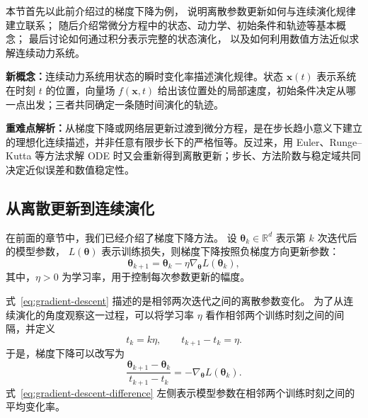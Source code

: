 \documentclass[UTF8,a4paper,zihao=-4,oneside,openany]{ctexbook}
\begin{document}
本节首先以此前介绍过的梯度下降为例，
说明离散参数更新如何与连续演化规律建立联系；
随后介绍常微分方程中的状态、动力学、初始条件和轨迹等基本概念；
最后讨论如何通过积分表示完整的状态演化，
以及如何利用数值方法近似求解连续动力系统。

\begin{importantnote}
\textbf{新概念：}连续动力系统用状态的瞬时变化率描述演化规律。状态 \(\boldsymbol{x}(t)\) 表示系统在时刻 \(t\) 的位置，向量场 \(f(\boldsymbol{x},t)\) 给出该位置处的局部速度，初始条件决定从哪一点出发；三者共同确定一条随时间演化的轨迹。

\textbf{重难点解析：}从梯度下降或网络层更新过渡到微分方程，是在步长趋小意义下建立的理想化连续描述，并非任意有限步长下的严格恒等。反过来，用 Euler、Runge--Kutta 等方法求解 ODE 时又会重新得到离散更新；步长、方法阶数与稳定域共同决定近似误差和数值稳定性。
\end{importantnote}


\subsection{从离散更新到连续演化}
\label{subsec:discrete-to-continuous-evolution}

在前面的章节中，我们已经介绍了梯度下降方法。
设
\(\boldsymbol{\theta}_k\in\mathbb{R}^{d}\)
表示第 \(k\) 次迭代后的模型参数，
\(L(\boldsymbol{\theta})\)
表示训练损失，则梯度下降按照负梯度方向更新参数：
\begin{equation}
    \boldsymbol{\theta}_{k+1}
    =
    \boldsymbol{\theta}_k
    -
    \eta
    \nabla_{\boldsymbol{\theta}}
    L(\boldsymbol{\theta}_k),
    \label{eq:gradient-descent}
\end{equation}
其中，\(\eta>0\) 为学习率，用于控制每次参数更新的幅度。

式~\eqref{eq:gradient-descent} 描述的是相邻两次迭代之间的离散参数变化。
为了从连续演化的角度观察这一过程，可以将学习率 \(\eta\)
看作相邻两个训练时刻之间的间隔，并定义
\begin{equation}
    t_k=k\eta,
    \qquad
    t_{k+1}-t_k=\eta.
    \label{eq:training-time}
\end{equation}
于是，梯度下降可以改写为
\begin{equation}
    \frac{
        \boldsymbol{\theta}_{k+1}
        -
        \boldsymbol{\theta}_k
    }{
        t_{k+1}-t_k
    }
    =
    -
    \nabla_{\boldsymbol{\theta}}
    L(\boldsymbol{\theta}_k).
    \label{eq:gradient-descent-difference}
\end{equation}
式~\eqref{eq:gradient-descent-difference} 左侧表示模型参数在相邻两个训练时刻之间的
平均变化率。
\end{document}

